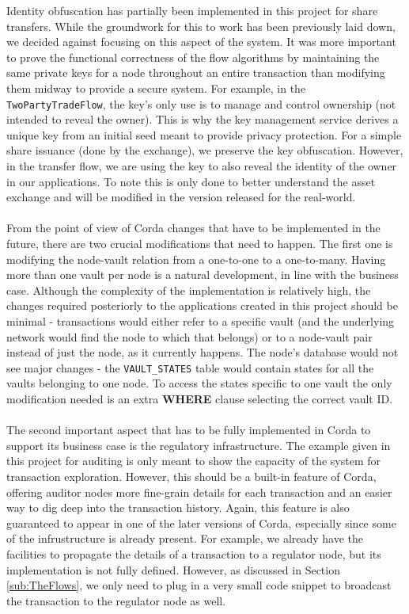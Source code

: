 \documentclass[12pt,twoside]{article}
\begin{document}
Identity obfuscation has partially been implemented in this project for share transfers. While the groundwork for this to work has been previously laid down, we decided against focusing on this aspect of the system. It was more important to prove the functional correctness of the flow algorithms by maintaining the same private keys for a node throughout an entire transaction than modifying them midway to provide a secure system. For example, in the \verb|TwoPartyTradeFlow|, the key's only use is to manage and control ownership (not intended to reveal the owner). This is why the key management service derives a unique key from an initial seed meant to provide privacy protection. For a simple share issuance (done by the exchange), we preserve the key obfuscation. However, in the transfer flow, we are using the key to also reveal the identity of the owner in our applications. To note this is only done to better understand the asset exchange and will be modified in the version released for the real-world.
\\ \\
From the point of view of Corda changes that have to be implemented in the future, there are two crucial modifications that need to happen. The first one is modifying the node-vault relation from a one-to-one to a one-to-many. Having more than one vault per node is a natural development, in line with the business case. Although the complexity of the implementation is relatively high, the changes required posteriorly to the applications created in this project should be minimal - transactions would either refer to a specific vault (and the underlying network would find the node to which that belongs) or to a node-vault pair instead of just the node, as it currently happens. The node's database would not see major changes - the \verb|VAULT_STATES| table would contain states for all the vaults belonging to one node. To access the states specific to one vault the only modification needed is an extra \textbf{WHERE} clause selecting the correct vault ID.
\\ \\
The second important aspect that has to be fully implemented in Corda to support its business case is the regulatory infrastructure. The example given in this project for auditing is only meant to show the capacity of the system for transaction exploration. However, this should be a built-in feature of Corda, offering auditor nodes more fine-grain details for each transaction and an easier way to dig deep into the transaction history. Again, this feature is also guaranteed to appear in one of the later versions of Corda, especially since some of the infrustructure is already present. For example, we already have the facilities to propagate the details of a transaction to a regulator node, but its implementation is not fully defined. However, as discussed in Section \ref{sub:TheFlows}, we only need to plug in a very small code snippet to broadcast the transaction to the regulator node as well.
\end{document}
